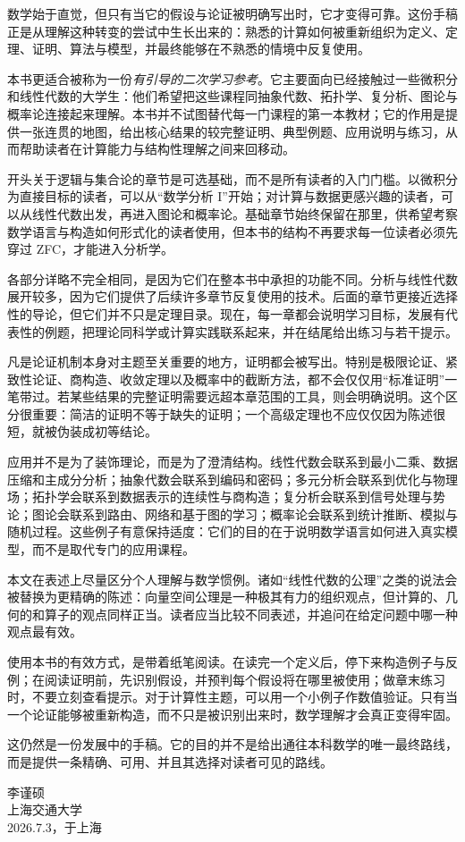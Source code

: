 \prefacechapter
\thispagestyle{empty}

数学始于直觉，但只有当它的假设与论证被明确写出时，它才变得可靠。这份手稿正是从理解这种转变的尝试中生长出来的：熟悉的计算如何被重新组织为定义、定理、证明、算法与模型，并最终能够在不熟悉的情境中反复使用。

本书更适合被称为一份\emph{有引导的二次学习参考}。它主要面向已经接触过一些微积分和线性代数的大学生：他们希望把这些课程同抽象代数、拓扑学、复分析、图论与概率论连接起来理解。本书并不试图替代每一门课程的第一本教材；它的作用是提供一张连贯的地图，给出核心结果的较完整证明、典型例题、应用说明与练习，从而帮助读者在计算能力与结构性理解之间来回移动。

开头关于逻辑与集合论的章节是可选基础，而不是所有读者的入门门槛。以微积分为直接目标的读者，可以从“数学分析 I”开始；对计算与数据更感兴趣的读者，可以从线性代数出发，再进入图论和概率论。基础章节始终保留在那里，供希望考察数学语言与构造如何形式化的读者使用，但本书的结构不再要求每一位读者必须先穿过 ZFC，才能进入分析学。

各部分详略不完全相同，是因为它们在整本书中承担的功能不同。分析与线性代数展开较多，因为它们提供了后续许多章节反复使用的技术。后面的章节更接近选择性的导论，但它们并不只是定理目录。现在，每一章都会说明学习目标，发展有代表性的例题，把理论同科学或计算实践联系起来，并在结尾给出练习与若干提示。

凡是论证机制本身对主题至关重要的地方，证明都会被写出。特别是极限论证、紧致性论证、商构造、收敛定理以及概率中的截断方法，都不会仅仅用“标准证明”一笔带过。若某些结果的完整证明需要远超本章范围的工具，则会明确说明。这个区分很重要：简洁的证明不等于缺失的证明；一个高级定理也不应仅仅因为陈述很短，就被伪装成初等结论。

应用并不是为了装饰理论，而是为了澄清结构。线性代数会联系到最小二乘、数据压缩和主成分分析；抽象代数会联系到编码和密码；多元分析会联系到优化与物理场；拓扑学会联系到数据表示的连续性与商构造；复分析会联系到信号处理与势论；图论会联系到路由、网络和基于图的学习；概率论会联系到统计推断、模拟与随机过程。这些例子有意保持适度：它们的目的在于说明数学语言如何进入真实模型，而不是取代专门的应用课程。

本文在表述上尽量区分个人理解与数学惯例。诸如“线性代数的公理”之类的说法会被替换为更精确的陈述：向量空间公理是一种极其有力的组织观点，但计算的、几何的和算子的观点同样正当。读者应当比较不同表述，并追问在给定问题中哪一种观点最有效。

使用本书的有效方式，是带着纸笔阅读。在读完一个定义后，停下来构造例子与反例；在阅读证明前，先识别假设，并预判每个假设将在哪里被使用；做章末练习时，不要立刻查看提示。对于计算性主题，可以用一个小例子作数值验证。只有当一个论证能够被重新构造，而不只是被识别出来时，数学理解才会真正变得牢固。

这仍然是一份发展中的手稿。它的目的并不是给出通往本科数学的唯一最终路线，而是提供一条精确、可用、并且其选择对读者可见的路线。

\begin{flushright}
李谨硕 \\
上海交通大学 \\
2026.7.3，于上海
\end{flushright}
